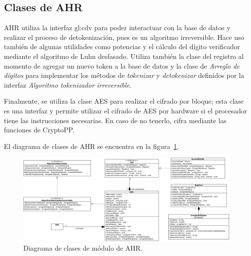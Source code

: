 %
%
%

\subsection{Clases de AHR}

AHR utiliza la interfaz \acrshort{gl:cdv} para poder interactuar con la base de
datos y realizar el proceso de detokenización, pues es un algoritmo
irreversible. Hace uso también de algunas utilidades como potencias y
el cálculo del dígito verificador mediante el algoritmo de Luhn desfasado.
Utiliza también la clase del registro al momento de agregar un nuevo token
a la base de datos y la clase de \textit{Arreglo de dígitos} para implementar
los métodos de \textit{tokenizar} y \textit{detokenizar} definidos por la
interfaz \textit{Algoritmo tokenizador irreversible}.

Finalmente, se utiliza la clase AES para realizar el cifrado por bloque; esta
clase es una interfaz y permite utilizar el cifrado de AES por hardware si
el procesador tiene las instrucciones necesarias. En caso de no tenerlo,
cifra mediante las funciones de CryptoPP.

El diagrama de clases de AHR se encuentra en la figura~\ref{clases_ahr}.
\begin{figure}
  \begin{center}
    \includegraphics[width=1.0\linewidth]{diagramas/ahr.png}
    \caption{Diagrama de clases de módulo de AHR.}
    \label{clases_ahr}
  \end{center}
\end{figure}

